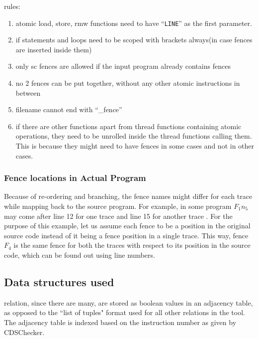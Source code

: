 rules:
\begin{enumerate}
	\item atomic load, store, rmw functions need to have ``{\tt{\textunderscore\textunderscore LINE\textunderscore\textunderscore}}'' as the first parameter.
	\item if statements and loops need to be scoped with brackets always(in case fences are inserted inside them)
	\item only sc fences are allowed if the input program already contains fences
	\item no 2 fences can be put together, without any other atomic instructions in between
	\item filename cannot end with ``\_fence''
	\item if there are other functions apart from thread functions containing atomic operations, they need to be unrolled inside the thread functions calling them. This is because they might need to have fences in some cases and not in other cases.
\end{enumerate}

\subsubsection{Fence locations in Actual Program}
Because of re-ordering and branching, the fence names might 
differ for each trace while mapping back to the source program. 
For example, in some program \textit{$F_1n_5$} may come after line 12 
for one trace and line 15 for another trace . For the purpose of this 
example, let us assume each fence to be a position in the original 
source code instead of it being a fence position in a single trace. 
This way, fence \textit{$F_4$} is the same fence for both the traces 
with respect to its position in the source code, which can be found 
out using line numbers.

\subsection{Data structures used}
\setHB relation, since there are many, are stored as boolean values in 
an adjacency table, as opposed to the ``list of tuples" format used for 
all other relations in the tool. The adjacency table is indexed based 
on the instruction number as given by CDSChecker. 

